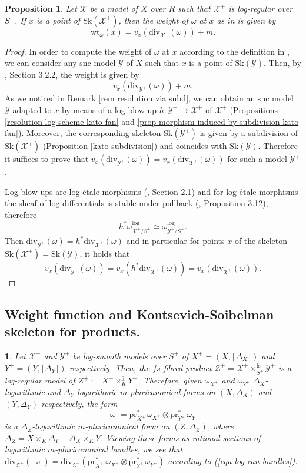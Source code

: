 \documentclass{amsart}%
\numberwithin{equation}{subsection}
\theoremstyle{plain2}
\newtheorem{prop}[equation]{Proposition}
\theoremstyle{definition2}
\theoremstyle{stepstyle}
\theoremstyle{point}
\theoremstyle{subpoint}
\newtheorem{subpoint}[equation]{}%
\newcommand{\spa}[1]{\begin{subpoint}#1\end{subpoint}}           %
\newcommand{\cX}{\ensuremath{\mathscr{X}}}
\newcommand{\cY}{\ensuremath{\mathscr{Y}}}
\newcommand{\cZ}{\ensuremath{\mathscr{Z}}}
\renewcommand{\cZ}{\ensuremath{\mathscr{Z}}}
\renewcommand{\cY}{\ensuremath{\mathscr{Y}}}
\newcommand{\pr}{\mathrm{pr}}
\newcommand{\divisor}{\mathrm{div}}
\newcommand{\weight}{\mathrm{wt}}
\newcommand{\Sk}{\mathrm{Sk}}
\begin{document}
\begin{prop} \label{prop weight function log formula}
Let $\cX$ be a model of $X$ over $R$ such that $\cX^+$ is log-regular over $S^+$. If $x$ is a point of $\Sk(\cX^+)$, then the weight of $\omega$ at $x$ as in \cite{MustataNicaise} is given by $$\weight_{\omega}(x)=v_x(\divisor_{\cX^+}(\omega)) +m.$$
\end{prop}
\begin{proof}
In order to compute the weight of $\omega$ at $x$ according to the definition in \cite{MustataNicaise}, we can consider any snc model $\cY$ of $X$ such that $x$ is a point of $\Sk(\cY)$. Then, by \cite{NicaiseXu}, Section 3.2.2, the weight is given by $$v_x(\divisor_{\cY^+}(\omega))+m.$$
As we noticed in Remark \ref{rem resolution via subd}, we can obtain an snc model $\cY$ adapted to $x$ by means of a log blow-up $h: \cY^+ \rightarrow \cX^+$ of $\cX^+$ (Propositions \ref{resolution log scheme kato fan} and \ref{prop morphism induced by subdivision kato fan}). Moreover, the corresponding skeleton $\Sk(\cY^+)$ is given by a subdivision of $\Sk(\cX^+)$ (Proposition \ref{kato subdivision}) and coincides with $\Sk(\cY)$. Therefore it suffices to prove that $v_x(\divisor_{\cY^+}(\omega)) =   v_x(\divisor_{\cX^+}(\omega))$ for such a model $\cY^+$.

Log blow-ups are log-\'{e}tale morphisms (\cite{Saito2004}, Section 2.1) and for log-\'{e}tale morphisms the sheaf of log differentials is stable under pullback (\cite{Kato1994a}, Proposition 3.12), therefore $$h^* \omega_{\cX^+/ S^+}^{\text{log}} \simeq \omega_{\cY^+/S^+}^{\text{log}}.$$ Then $\divisor_{\cY^+}(\omega)=h^* \divisor_{\cX^+}(\omega)$ and in particular for points $x$ of the skeleton $\Sk(\cX^+) = \Sk(\cY)$, it holds that $$v_{x}(\divisor_{\cY^+}(\omega))= v_{x}(h^*\divisor_{\cX^+}(\omega))= v_x(\divisor_{\cX^+}(\omega)).$$
\end{proof}


\subsection{Weight function and Kontsevich-Soibelman skeleton for products.} \label{paragraph weight function product}
\spa{Let $\cX^+$ and $\cY^+$ be log-smooth models over $S^+$ of $X^+=(X,\lceil\Delta_X\rceil)$ and $Y^+=(Y,\lceil\Delta_Y\rceil)$ respectively. Then, the $fs$ fibred product $\cZ^+=\cX^+  \times^{\text{fs}}_{S^+} \cY^+$ is a log-regular model of $Z^+:=X^+ \times^{\text{fs}}_K Y^+$. Therefore, given $\omega_{X^+}$ and $\omega_{Y^+}$ $\Delta_X$-logarithmic and $\Delta_Y$-logarithmic $m$-pluricanonical forms on $(X,\Delta_X)$ and $(Y,\Delta_Y)$ respectively, the form $$\varpi=\pr_{X^+}^* \,\omega_{X^+} \otimes \pr_{Y^+}^* \,\omega_{Y^+}$$ is a $\Delta_Z$-logarithmic $m$-pluricanonical form on $(Z,\Delta_Z)$, where $\Delta_Z= X \times_K \Delta_Y + \Delta_X \times_K Y$. Viewing these forms as rational sections of logarithmic $m$-pluricanonical bundles, we see that $\divisor_{\cZ^+}(\varpi)=\divisor_{\cZ^+}( \pr_{X^+}^* \,\omega_{X^+} \otimes \pr_{Y^+}^* \,\omega_{Y^+})$ according to (\ref{equ log can bundles}).}
\end{document}
